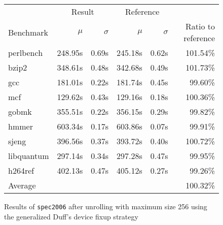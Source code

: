 \begin{figure}[th]
    \begin{center}
        \begin{tabular}{lrrrrr}
            \toprule
            & \multicolumn{2}{c}{Result} & \multicolumn{2}{c}{Reference}\\
            Benchmark & $\mu$ & $\sigma$ & $\mu$ & $\sigma$ & Ratio to reference\\
            \midrule
            perlbench & 248.95s & 0.69s & 245.18s & 0.62s & 101.54\%\\
            bzip2 & 348.61s & 0.48s & 342.68s & 0.49s & 101.73\%\\
            gcc & 181.01s & 0.22s & 181.74s & 0.45s & 99.60\%\\
            mcf & 129.62s & 0.43s & 129.16s & 0.18s & 100.36\%\\
            gobmk & 355.51s & 0.22s & 356.15s & 0.29s & 99.82\%\\
            hmmer & 603.34s & 0.17s & 603.86s & 0.07s & 99.91\%\\
            sjeng & 396.56s & 0.37s & 393.72s & 0.40s & 100.72\%\\
            libquantum & 297.14s & 0.34s & 297.28s & 0.47s & 99.95\%\\
            h264ref & 402.13s & 0.47s & 405.12s & 0.27s & 99.26\%\\
            \midrule
            Average & & & & & 100.32\%\\
            \bottomrule
        \end{tabular}
    \end{center}
    \caption{Results of \texttt{spec2006} after unrolling with maximum size 256 using the generalized Duff's device fixup strategy}
    \label{fig:eval:perf:duff:256}
\end{figure}

